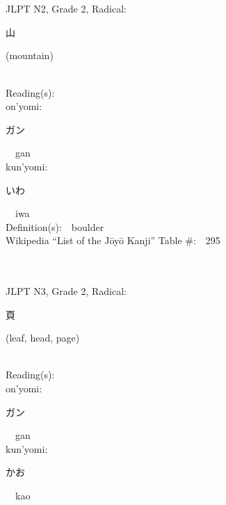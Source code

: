 \begin{multicols}{2}
\ \ \\
{\fontsize{34pt}{40pt}  }\ \ \\  %
{JLPT N2, Grade 2, Radical:\ \ {\begin{CJK}{UTF8}{min} 山 \end{CJK}} (mountain) } \\
Reading(s):\ \ \\
{\hspace*{1em}}on'yomi:\ \ \\
{\hspace*{2em}}{\begin{CJK}{UTF8}{min} ガン \end{CJK}}\ \ gan\ \ \\
{\hspace*{1em}}kun'yomi:\ \ \\
{\hspace*{2em}}{\begin{CJK}{UTF8}{min} いわ \end{CJK}}\ \ iwa\ \ \\
Definition(s):\ \ boulder \\
Wikipedia ``List of the J\=oy\=o Kanji'' Table \#:\ \ 295 \\
\ \ \\
{\fontsize{34pt}{40pt}  }\ \ \\  %
{JLPT N3, Grade 2, Radical:\ \ {\begin{CJK}{UTF8}{min} 頁 \end{CJK}} (leaf, head, page) } \\
Reading(s):\ \ \\
{\hspace*{1em}}on'yomi:\ \ \\
{\hspace*{2em}}{\begin{CJK}{UTF8}{min} ガン \end{CJK}}\ \ gan\ \ \\
{\hspace*{1em}}kun'yomi:\ \ \\
{\hspace*{2em}}{\begin{CJK}{UTF8}{min} かお \end{CJK}}\ \ kao\ \ \\

\end{multicols}
